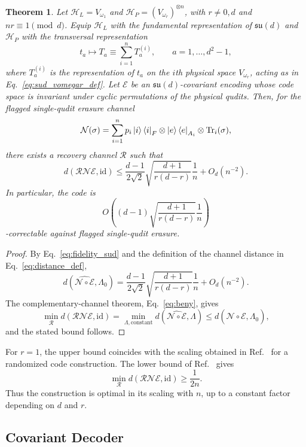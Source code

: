 \documentclass[10pt,twocolumn,superscriptaddress,aps,amsmath,amssymb,citeautoscript,floatfix,prx]{revtex4-2}
\newtheorem{theorem}{Theorem}
\theoremstyle{plain}
\theoremstyle{plain}
\theoremstyle{plain}
\theoremstyle{plain}
\theoremstyle{plain}
\theoremstyle{plain}
\theoremstyle{plain}
\theoremstyle{definition}
\theoremstyle{plain}
\begin{document}
\begin{theorem}\label{thrm:sudscale}
Let $\mathcal H_L=V_{\omega_1}$ and $\mathcal H_P=(V_{\omega_r})^{\otimes n}$, with $r\neq 0,d$ and $nr\equiv 1\pmod d$. 
Equip $\mathcal H_L$ with the fundamental representation of $\mathfrak{su}(d)$ and $\mathcal H_P$ with the transversal representation
\begin{equation}
t_a
\longmapsto
T_a
\equiv
\sum_{i=1}^n T_a^{(i)},
\qquad
a=1,\ldots,d^2-1,
\end{equation}
where $T_a^{(i)}$ is the representation of $t_a$ on the $i$th physical space $V_{\omega_r}$, acting as in Eq.~\eqref{eq:sud_vomegar_def}. 
Let $\mathcal E$ be an $\mathfrak{su}(d)$-covariant encoding whose code space is invariant under cyclic permutations of the physical qudits. 
Then, for the flagged single-qudit erasure channel
$$
\mathcal N(\sigma)
=
\sum_{i=1}^n
p_i\ket i\bra i_F
\otimes
\ket e\bra e_{A_i}
\otimes
\operatorname{Tr}_i(\sigma),
$$
there exists a recovery channel $\mathcal R$ such that
$$
d(\mathcal R\mathcal N\mathcal E,\mathrm{id})
\le
\frac{d-1}{2\sqrt 2}
\sqrt{\frac{d+1}{r(d-r)}}
\frac1n
+
O_{d}(n^{-2}) .
$$
In particular, the code is
$$
O\left(
(d-1)
\sqrt{\frac{d+1}{r(d-r)}}
\frac1n
\right)
$$
-correctable against flagged single-qudit erasure.
\end{theorem}

\begin{proof}
By Eq.~\eqref{eq:fidelity_sud} and the definition of the channel distance in Eq.~\eqref{eq:distance_def},
$$
d\left(\widehat{\mathcal N\circ\mathcal E},\Lambda_0\right)
=
\frac{d-1}{2\sqrt 2}
\sqrt{\frac{d+1}{r(d-r)}}
\frac1n
+
O_{d}(n^{-2}) .
$$
The complementary-channel theorem, Eq.~\eqref{eq:beny}, gives
$$
\min_{\mathcal R}
d(\mathcal R\mathcal N\mathcal E,\mathrm{id})
=
\min_{\Lambda,\mathrm{constant}}
d\left(\widehat{\mathcal N\circ\mathcal E},\Lambda\right)
\le
d\left(\widehat{\mathcal N\circ\mathcal E},\Lambda_0\right),
$$
and the stated bound follows.
\end{proof}

For $r=1$, the upper bound coincides with the scaling obtained in Ref.~\cite{Kong2022} for a randomized code construction. The lower bound of Ref.~\cite{Faist2020} gives
$$
\min_{\mathcal R}
d(\mathcal R\mathcal N\mathcal E,\mathrm{id})
\ge
\frac{1}{2n}.
$$
Thus the construction is optimal in its scaling with $n$, up to a constant factor depending on $d$ and $r$.

\subsection{Covariant Decoder}\label{subsec:main_decoder}
\end{document}
